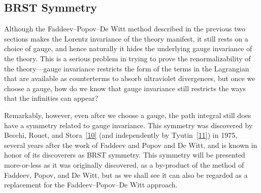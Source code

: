 \subsection{BRST Symmetry}

Although the Faddeev--Popov--De Witt method described in the previous two sections makes the Lorentz invariance of the theory manifest, it still rests on a choice of gauge, and hence naturally it hides the underlying gauge invariance of the theory. This is a serious problem in trying to prove the renormalizability of the theory---gauge invariance restricts the form of the terms in the Lagrangian that are available as counterterms to absorb ultraviolet divergences, but once we choose a gauge, how do we know that gauge invariance still restricts the ways that the infinities can appear?

Remarkably, however, even after we choose a gauge, the path integral still does have a symmetry related to gauge invariance. This symmetry was discovered by Becchi, Rouet, and Stora~\hyperref[ch15-ref-10]{[10]} (and independently by Tyutin~\hyperref[ch15-ref-11]{[11]}) in 1975, several years after the work of Faddeev and Popov and De Witt, and is known in honor of its discoverers as BRST symmetry. This symmetry will be presented more-or-less as it was originally discovered, as a by-product of the method of Faddeev, Popov, and De Witt, but as we shall see it can also be regarded as a replacement for the Faddeev--Popov--De Witt approach.

